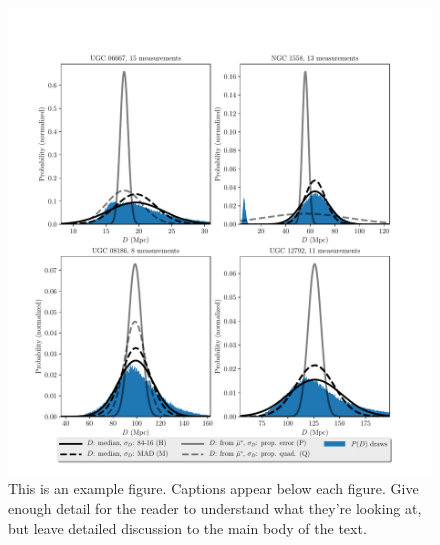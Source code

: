 \documentclass[a4paper,fleqn,usenatbib]{mnras}
\begin{document}
\begin{figure}

	\includegraphics[scale=0.7]{comp}
    \caption{This is an example figure. Captions appear below each figure.
	Give enough detail for the reader to understand what they're looking at,
	but leave detailed discussion to the main body of the text.}
    \label{fig:comp}
\end{figure}
\end{document}
